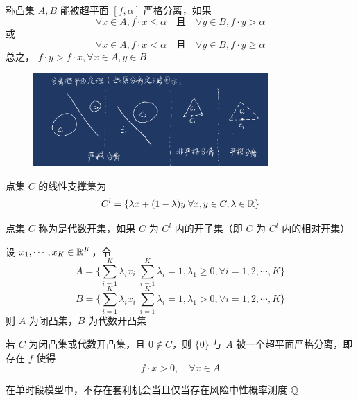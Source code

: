 \begin{definition}[凸集严格分离]
    称凸集 $A,B$ 能被超平面 $[f,\alpha]$ 严格分离，如果
    \[
    \forall x\in A,f\cdot x\leq \alpha\quad \text{且}\quad \forall y\in B,f\cdot y>\alpha
    \]
    或
    \[
    \forall x\in A,f\cdot x< \alpha\quad \text{且}\quad \forall y\in B,f\cdot y\geq \alpha
    \]
    总之， $f\cdot y>f\cdot x,\forall x\in A,y\in B$
\end{definition}

\begin{figure}[H]
    \centering
    \includegraphics[width=0.8\textwidth]{figures/凸集分离.jpeg} %
\end{figure}

\begin{definition}[点集的线性支撑集]
    点集 $C$ 的线性支撑集为
    \[
    C^l=\{\lambda x+(1-\lambda)y|\forall x,y\in C,\lambda \in \mathbb{R}\}
    \]
\end{definition}

\begin{definition}[代数开集]
    点集 $C$ 称为是代数开集，如果 $C$ 为 $C^l$ 内的开子集（即 $C$ 为 $C^l$ 内的相对开集）
\end{definition}

\begin{example}
    设 $x_1,\cdots,x_K\in \mathbb{R}^K$，令
    \[
    A=\{\sum_{i=1}^K\lambda_i x_i|\sum_{i=1}^K\lambda_i=1,\lambda_1\geq 0,\forall i=1,2,\cdots ,K\}
    \]
    \[
    B=\{\sum_{i=1}^K\lambda_i x_i|\sum_{i=1}^K\lambda_i=1,\lambda_1> 0,\forall i=1,2,\cdots ,K\}
    \]
    则 $A$ 为闭凸集，$B$ 为代数开凸集
\end{example}

\begin{theorem}[凸集分离定理]
    若 $C$ 为闭凸集或代数开凸集，且 $0\notin C$，则 $\{0\}$ 与 $A$ 被一个超平面严格分离，即存在 $f$ 使得
    \[
    f\cdot x>0,\quad \forall x\in A
    \]
\end{theorem}

\begin{theorem}
    在单时段模型中，不存在套利机会当且仅当存在风险中性概率测度 $\mathbb{Q}$
\end{theorem}

